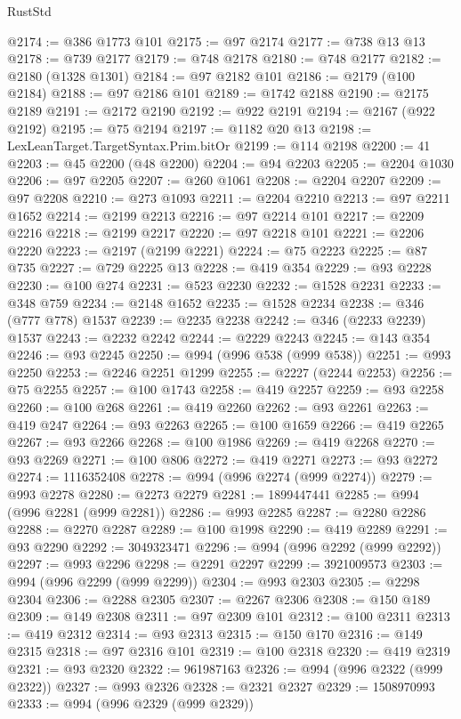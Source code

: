 \begin{lexlean}{RustStd}
\begin{coremodule}
@2174 := @386 @1773 @101
@2175 := @97 @2174
@2177 := @738 @13 @13
@2178 := @739 @2177
@2179 := @748 @2178
@2180 := @748 @2177
@2182 := @2180 (@1328 @1301)
@2184 := @97 @2182 @101
@2186 := @2179 (@100 @2184)
@2188 := @97 @2186 @101
@2189 := @1742 @2188
@2190 := @2175 @2189
@2191 := @2172 @2190
@2192 := @922 @2191
@2194 := @2167 (@922 @2192)
@2195 := @75 @2194
@2197 := @1182 @20 @13
@2198 := LexLeanTarget.TargetSyntax.Prim.bitOr
@2199 := @114 @2198
@2200 := 41
@2203 := @45 @2200 (@48 @2200)
@2204 := @94 @2203
@2205 := @2204 @1030
@2206 := @97 @2205
@2207 := @260 @1061
@2208 := @2204 @2207
@2209 := @97 @2208
@2210 := @273 @1093
@2211 := @2204 @2210
@2213 := @97 @2211 @1652
@2214 := @2199 @2213
@2216 := @97 @2214 @101
@2217 := @2209 @2216
@2218 := @2199 @2217
@2220 := @97 @2218 @101
@2221 := @2206 @2220
@2223 := @2197 (@2199 @2221)
@2224 := @75 @2223
@2225 := @87 @735
@2227 := @729 @2225 @13
@2228 := @419 @354
@2229 := @93 @2228
@2230 := @100 @274
@2231 := @523 @2230
@2232 := @1528 @2231
@2233 := @348 @759
@2234 := @2148 @1652
@2235 := @1528 @2234
@2238 := @346 (@777 @778) @1537
@2239 := @2235 @2238
@2242 := @346 (@2233 @2239) @1537
@2243 := @2232 @2242
@2244 := @2229 @2243
@2245 := @143 @354
@2246 := @93 @2245
@2250 := @994 (@996 @538 (@999 @538))
@2251 := @993 @2250
@2253 := @2246 @2251 @1299
@2255 := @2227 (@2244 @2253)
@2256 := @75 @2255
@2257 := @100 @1743
@2258 := @419 @2257
@2259 := @93 @2258
@2260 := @100 @268
@2261 := @419 @2260
@2262 := @93 @2261
@2263 := @419 @247
@2264 := @93 @2263
@2265 := @100 @1659
@2266 := @419 @2265
@2267 := @93 @2266
@2268 := @100 @1986
@2269 := @419 @2268
@2270 := @93 @2269
@2271 := @100 @806
@2272 := @419 @2271
@2273 := @93 @2272
@2274 := 1116352408
@2278 := @994 (@996 @2274 (@999 @2274))
@2279 := @993 @2278
@2280 := @2273 @2279
@2281 := 1899447441
@2285 := @994 (@996 @2281 (@999 @2281))
@2286 := @993 @2285
@2287 := @2280 @2286
@2288 := @2270 @2287
@2289 := @100 @1998
@2290 := @419 @2289
@2291 := @93 @2290
@2292 := 3049323471
@2296 := @994 (@996 @2292 (@999 @2292))
@2297 := @993 @2296
@2298 := @2291 @2297
@2299 := 3921009573
@2303 := @994 (@996 @2299 (@999 @2299))
@2304 := @993 @2303
@2305 := @2298 @2304
@2306 := @2288 @2305
@2307 := @2267 @2306
@2308 := @150 @189
@2309 := @149 @2308
@2311 := @97 @2309 @101
@2312 := @100 @2311
@2313 := @419 @2312
@2314 := @93 @2313
@2315 := @150 @170
@2316 := @149 @2315
@2318 := @97 @2316 @101
@2319 := @100 @2318
@2320 := @419 @2319
@2321 := @93 @2320
@2322 := 961987163
@2326 := @994 (@996 @2322 (@999 @2322))
@2327 := @993 @2326
@2328 := @2321 @2327
@2329 := 1508970993
@2333 := @994 (@996 @2329 (@999 @2329))

\end{coremodule}
\end{lexlean}

